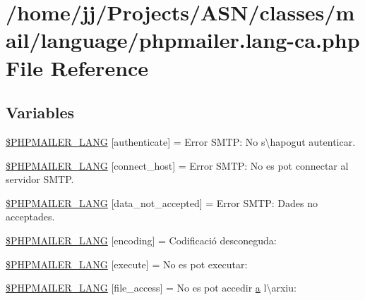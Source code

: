 \hypertarget{phpmailer_8lang-ca_8php}{}\section{/home/jj/\+Projects/\+A\+S\+N/classes/mail/language/phpmailer.lang-\/ca.php File Reference}
\label{phpmailer_8lang-ca_8php}
\subsection*{Variables}
\begin{DoxyCompactItemize}
\item 
\hyperlink{phpmailer_8lang-ca_8php_a2cb33073c989b85580748e331ed8b4aa}{\$\+P\+H\+P\+M\+A\+I\+L\+E\+R\+\_\+\+L\+A\+NG} \mbox{[}\textquotesingle{}authenticate\textquotesingle{}\mbox{]} = \textquotesingle{}Error S\+M\+T\+P\+: No s\textbackslash{}\textquotesingle{}hapogut autenticar.\textquotesingle{}
\item 
\hyperlink{phpmailer_8lang-ca_8php_a2ee0cc637a06b96e45600db31c6799ee}{\$\+P\+H\+P\+M\+A\+I\+L\+E\+R\+\_\+\+L\+A\+NG} \mbox{[}\textquotesingle{}connect\+\_\+host\textquotesingle{}\mbox{]} = \textquotesingle{}Error S\+M\+T\+P\+: No es pot connectar al servidor S\+M\+T\+P.\textquotesingle{}
\item 
\hyperlink{phpmailer_8lang-ca_8php_a814c6b191205d2361b3233e9c9d6fda5}{\$\+P\+H\+P\+M\+A\+I\+L\+E\+R\+\_\+\+L\+A\+NG} \mbox{[}\textquotesingle{}data\+\_\+not\+\_\+accepted\textquotesingle{}\mbox{]} = \textquotesingle{}Error S\+M\+T\+P\+: Dades no acceptades.\textquotesingle{}
\item 
\hyperlink{phpmailer_8lang-ca_8php_a817f7283f3d54c970a0c10305cc668cc}{\$\+P\+H\+P\+M\+A\+I\+L\+E\+R\+\_\+\+L\+A\+NG} \mbox{[}\textquotesingle{}encoding\textquotesingle{}\mbox{]} = \textquotesingle{}Codificació desconeguda\+: \textquotesingle{}
\item 
\hyperlink{phpmailer_8lang-ca_8php_a668217a9563a168f30f2a8548b6ed5a9}{\$\+P\+H\+P\+M\+A\+I\+L\+E\+R\+\_\+\+L\+A\+NG} \mbox{[}\textquotesingle{}execute\textquotesingle{}\mbox{]} = \textquotesingle{}No es pot executar\+: \textquotesingle{}
\item 
\hyperlink{phpmailer_8lang-ca_8php_a7e83349023b856ef9e5c46e30ae6d51e}{\$\+P\+H\+P\+M\+A\+I\+L\+E\+R\+\_\+\+L\+A\+NG} \mbox{[}\textquotesingle{}file\+\_\+access\textquotesingle{}\mbox{]} = \textquotesingle{}No es pot accedir \hyperlink{_chart_8min_8js_aef3b685c08bc6c76c8e729bd0e93901d}{a} l\textbackslash{}\textquotesingle{}arxiu\+: \textquotesingle{}

\end{DoxyCompactItemize}

